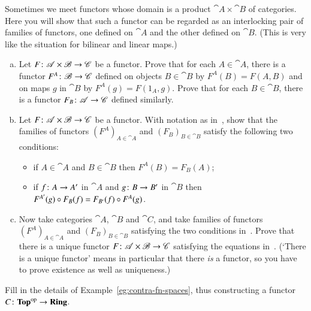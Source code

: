 \begin{question}        
\label{ex:ftr-on-product}
Sometimes we meet functors whose domain is a product%
%
%
$\cat{A} \times \cat{B}$ of categories.  Here you will show that such a
functor can be regarded as an interlocking pair of families of functors,
one defined on $\cat{A}$ and the other defined on $\cat{B}$.  (This is very
like the situation for bilinear and linear maps.)
% 
\begin{enumerate}[(b)]
\item   
\label{part:prod-ftr-compts} 
Let $F\from \cat{A} \times \cat{B} \to \cat{C}$ be a functor.  
Prove that for each $A \in \cat{A}$, there is a functor $F^A\from
\cat{B} \to \cat{C}$ defined on objects $B \in \cat{B}$ by $F^A(B) = F(A,
B)$ and on maps $g$ in $\cat{B}$ by $F^A(g) = F(1_A, g)$.  Prove that for
each $B \in \cat{B}$, there is a functor $F_B \from \cat{A} \to \cat{C}$
defined similarly.  

\item   
\label{part:prod-ftr-condns}
Let $F \from \cat{A} \times \cat{B} \to \cat{C}$ be a functor.  With
notation as in~, show that
the families of functors $(F^A)_{A \in \cat{A}}$ and $(F_B)_{B \in
  \cat{B}}$ satisfy the following two conditions:
% 
\begin{itemize}
\item 
if $A \in \cat{A}$ and $B \in \cat{B}$ then $F^A(B) = F_B(A)$;

\item 
if $f\from A \to A'$ in $\cat{A}$ and $g\from B \to B'$ in $\cat{B}$ then
$F^{A'}(g) \mathbin{\circ} F_B(f) = F_{B'}(f) \mathbin{\circ} F^A(g)$.
\end{itemize}

\item
Now take categories $\cat{A}$, $\cat{B}$ and $\cat{C}$, and take families
of functors $(F^A)_{A \in \cat{A}}$ and $(F_B)_{B \in \cat{B}}$ satisfying
the two conditions in~.  Prove that there is a
unique functor $F\from \cat{A} \times \cat{B} \to \cat{C}$ satisfying the
equations in~.  (`There is a unique functor'
means in particular that there \emph{is} a functor, so you have to prove
existence as well as uniqueness.)
\end{enumerate}
\end{question}


\begin{question}
\label{ex:contra-fn-spaces}
Fill in the details of Example~\ref{eg:contra-fn-spaces}, thus constructing
a functor $C\from \Tp^\op \to \Ring$.  
\end{question}


